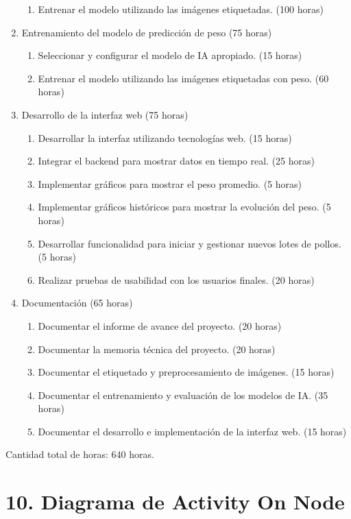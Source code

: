 \documentclass[
11pt, %
]{charter}
\begin{document}
\begin{enumerate}
\begin{enumerate}
	\item Entrenar el modelo utilizando las imágenes etiquetadas. (100 horas)
	\end{enumerate}
\item Entrenamiento del modelo de predicción de peso (75 horas)
	\begin{enumerate}
	\item Seleccionar y configurar el modelo de IA apropiado. (15 horas)
	\item Entrenar el modelo utilizando las imágenes etiquetadas con peso. (60 horas)
	\end{enumerate}
\item Desarrollo de la interfaz web (75 horas)
	\begin{enumerate}
	\item Desarrollar la interfaz utilizando tecnologías web. (15 horas)
	\item Integrar el backend para mostrar datos en tiempo real. (25 horas)
	\item Implementar gráficos para mostrar el peso promedio. (5 horas)
	\item Implementar gráficos históricos para mostrar la evolución del peso. (5 horas)
	\item Desarrollar funcionalidad para iniciar y gestionar nuevos lotes de pollos. (5 horas)
	\item Realizar pruebas de usabilidad con los usuarios finales. (20 horas)
	\end{enumerate}
\item Documentación (65 horas)
	\begin{enumerate}
	\item Documentar el informe de avance del proyecto. (20 horas)
	\item Documentar la memoria técnica del proyecto. (20 horas)
	\item Documentar el etiquetado y preprocesamiento de imágenes. (15 horas)
	\item Documentar el entrenamiento y evaluación de los modelos de IA. (35 horas)
	\item Documentar el desarrollo e implementación de la interfaz web. (15 horas)
	\end{enumerate}
\end{enumerate}

Cantidad total de horas: 640 horas.

\section{10. Diagrama de Activity On Node}
\label{sec:AoN}
\end{document}
